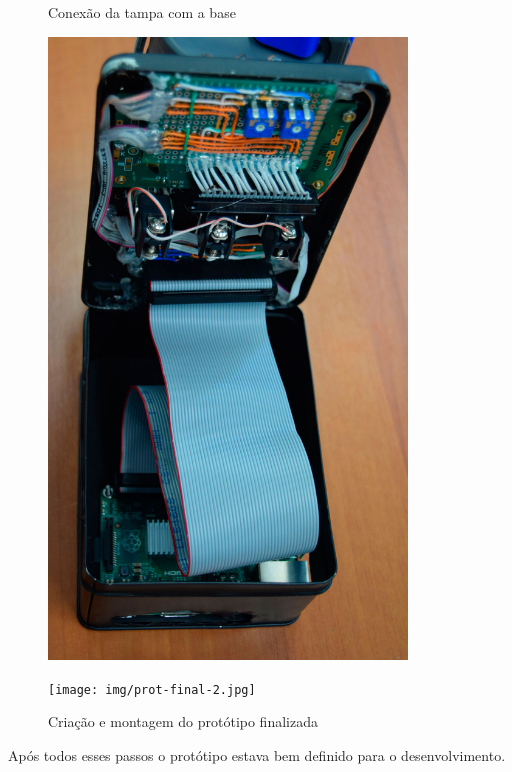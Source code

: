 \begin{figure}[htb]
	\centering
 	\begin{minipage}{0.45\textwidth}
		\centering
		\caption{\label{fig:tampa-base}Conexão da tampa com a base}
		\includegraphics[width=0.85\textwidth]{img/tampa-base.jpg}
	\end{minipage}
	\hfill
	\begin{minipage}{0.45\textwidth}
		\centering
		\caption{\label{fig:prot-final}Criação e montagem do protótipo finalizada}
		\texttt{[image: img/prot-final-2.jpg]}
	\end{minipage}
\end{figure}

Após todos esses passos o protótipo estava bem definido para o desenvolvimento.

